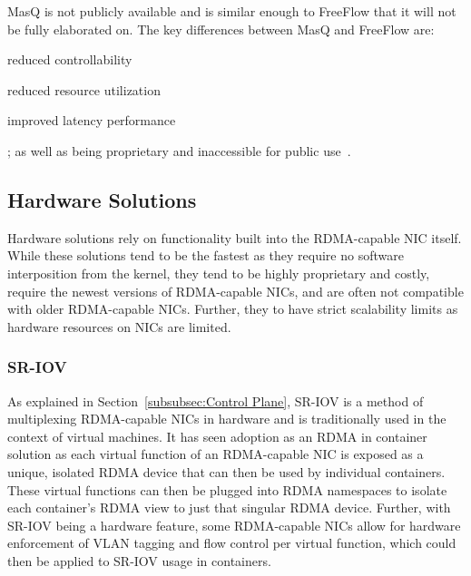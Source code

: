 \documentclass[12pt,titlepage]{article}
\begin{document}
MasQ is not publicly available and is similar enough to FreeFlow that it will not be fully elaborated on.
The key differences between MasQ and FreeFlow are:
\begin{enumerate*}[label={(\arabic*)},itemjoin*={{, and }},itemjoin={{, }}]
	\item reduced controllability
	\item reduced resource utilization
	\item improved latency performance
\end{enumerate*};
as well as being proprietary and inaccessible for public use~\cite{he2020masq}.

\subsection{Hardware Solutions}
Hardware solutions rely on functionality built into the RDMA-capable NIC itself.
While these solutions tend to be the fastest as they require no software interposition from the kernel, they tend to be highly proprietary and costly, require the newest versions of RDMA-capable NICs, and are often not compatible with older RDMA-capable NICs.
Further, they to have strict scalability limits as hardware resources on NICs are limited.


\subsubsection{SR-IOV}
As explained in Section~\ref{subsubsec:Control Plane}, SR-IOV is a method of multiplexing RDMA-capable NICs in hardware and is traditionally used in the context of virtual machines.
It has seen adoption as an RDMA in container solution as each virtual function of an RDMA-capable NIC is exposed as a unique, isolated RDMA device that can then be used by individual containers.
These virtual functions can then be plugged into RDMA namespaces to isolate each container's RDMA view to just that singular RDMA device.
Further, with SR-IOV being a hardware feature, some RDMA-capable NICs allow for hardware enforcement of VLAN tagging and flow control per virtual function, which could then be applied to SR-IOV usage in containers.
\end{document}

